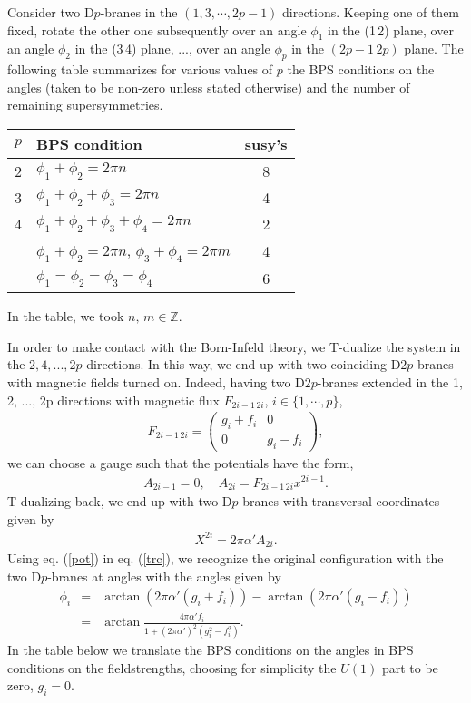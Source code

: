 \documentclass[a4paper,12pt,oneside]{article}
\def\IZ{\mathbb{Z}}
\begin{document}
Consider two D$p$-branes in the $(1,3,\cdots, 2p-1)$ directions. 
Keeping one of them fixed, rotate the other one subsequently
over an angle $\phi_1$ in the (1\,2) plane, over an angle $\phi_2$ in the 
(3\,4) plane, ..., over an angle $\phi_p$ in the $(2p-1\,2p)$ plane. The 
following table summarizes for various values of $p$ the BPS conditions 
on the angles (taken to be non-zero unless stated otherwise)
and the number of remaining supersymmetries.

\begin{center}
\begin{tabular}{|c|l|c|}\hline\hline
$p$ &BPS condition & susy's\\ \hline\hline
2 &$\phi_1+\phi_2=2\pi n$ & 8\\ \hline
3 &$\phi_1+\phi_2+\phi_3=2\pi n$ & 4\\ \hline
4 &$\phi_1+\phi_2+\phi_3+\phi_4=2\pi n$ & 2\\ \cline{2-3}
  &$\phi_1+\phi_2=2\pi n$, $\phi_3+\phi_4=2\pi m$&4 \\ \cline{2-3}
  &$\phi_1=\phi_2=\phi_3=\phi_4$&6 
\\ \hline\hline
\end{tabular}
\end{center}

\noindent In the table, we took $n,\,m\in\IZ$.

In order to make contact with the Born-Infeld theory, we T-dualize the 
system in the $2, 4, ..., 2p$ directions. In this way, we end up with 
two coinciding D$2p$-branes with magnetic fields turned on. Indeed, having
two D$2p$-branes extended in the 1, 2, ..., 2p directions with magnetic
flux $F_{2i-1\, 2i}$, $i\in\{1,\cdots,p\}$,
\begin{eqnarray}
F_{2i-1\,2i}=\left(  
\begin{array}{cc}
g_i+f_i&0\\
0&g_i-f_i 
\end{array}
\right),
\end{eqnarray}
we can choose a gauge such that the potentials have the form,
\begin{eqnarray}
A_{2i-1}=0,\quad A_{2i}=F_{2i-1\,2i}x^{2i-1}.\label{pot}
\end{eqnarray}
T-dualizing back, we end up with two D$p$-branes
with transversal coordinates given by 
\begin{eqnarray}
X^{2i}=2\pi\alpha 'A_{2i}.\label{trc}
\end{eqnarray}
Using eq. (\ref{pot}) in eq. (\ref{trc}), we recognize the original 
configuration with the two D$p$-branes at angles with the angles given by
\begin{eqnarray}
\phi_i&=&\arctan(2\pi\alpha '(g_i+f_i))-\arctan(2\pi\alpha '(g_i-f_i))\nonumber\\
&=&\arctan\frac{4\pi\alpha 'f_i}
{1+(2\pi\alpha ')^2(g_i^2-f_i^2)}.
\end{eqnarray}
In the table below we translate the BPS conditions on the angles in 
BPS conditions on the fieldstrengths, choosing for simplicity the $U(1)$ 
part to be zero, $g_i=0$.
\end{document}
